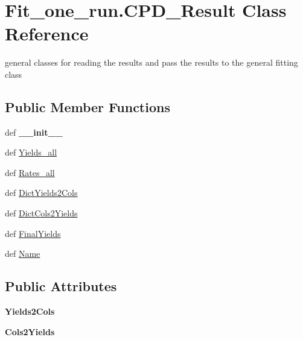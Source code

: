 \hypertarget{classFit__one__run_1_1CPD__Result}{\section{\-Fit\-\_\-one\-\_\-run.\-C\-P\-D\-\_\-\-Result \-Class \-Reference}
\label{classFit__one__run_1_1CPD__Result}
}


general classes for reading the results and pass the results to the general fitting class  


\subsection*{\-Public \-Member \-Functions}
\begin{DoxyCompactItemize}
\item 
\hypertarget{classFit__one__run_1_1CPD__Result_a79774f90a1a500e2cadc7e1993e28aab}{def {\bfseries \-\_\-\-\_\-init\-\_\-\-\_\-}}\label{classFit__one__run_1_1CPD__Result_a79774f90a1a500e2cadc7e1993e28aab}

\item 
def \hyperlink{classFit__one__run_1_1CPD__Result_a302ae661ad8717abb085caa73d7dda33}{\-Yields\-\_\-all}
\item 
def \hyperlink{classFit__one__run_1_1CPD__Result_af2206424404d8c9d6bf6dd988be520f9}{\-Rates\-\_\-all}
\item 
def \hyperlink{classFit__one__run_1_1CPD__Result_ac012296d148679aaad341d1d19d8f4b5}{\-Dict\-Yields2\-Cols}
\item 
def \hyperlink{classFit__one__run_1_1CPD__Result_a08bb851efadd9490694d9dd21df04b6b}{\-Dict\-Cols2\-Yields}
\item 
def \hyperlink{classFit__one__run_1_1CPD__Result_a9f589508052e6360ee138fe99ceb3980}{\-Final\-Yields}
\item 
def \hyperlink{classFit__one__run_1_1CPD__Result_a4aa569a40c2187f9e9bec5448cc6ef6c}{\-Name}
\end{DoxyCompactItemize}
\subsection*{\-Public \-Attributes}
\begin{DoxyCompactItemize}
\item 
\hypertarget{classFit__one__run_1_1CPD__Result_a663d4278b97d96b812f6c3fa89135310}{{\bfseries \-Yields2\-Cols}}\label{classFit__one__run_1_1CPD__Result_a663d4278b97d96b812f6c3fa89135310}

\item 
\hypertarget{classFit__one__run_1_1CPD__Result_a74b00329532fd8cbb3e687b8cde1dc0d}{{\bfseries \-Cols2\-Yields}}\label{classFit__one__run_1_1CPD__Result_a74b00329532fd8cbb3e687b8cde1dc0d}

\end{DoxyCompactItemize}


